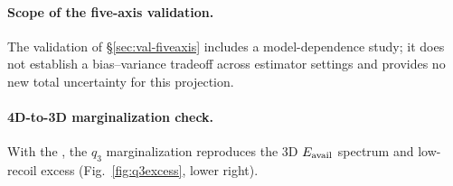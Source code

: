 
\paragraph{Scope of the five-axis validation.} The validation of \S\ref{sec:val-fiveaxis} includes a model-dependence study; it does not establish a bias--variance tradeoff across estimator settings and provides no new total uncertainty for this projection.

\paragraph{4D-to-3D marginalization check.} With the \estPurity{}, the $q_{3}$ marginalization reproduces the 3D $E_{\mathrm{avail}}$ spectrum and low-recoil excess (Fig.~\ref{fig:q3excess}, lower right).

